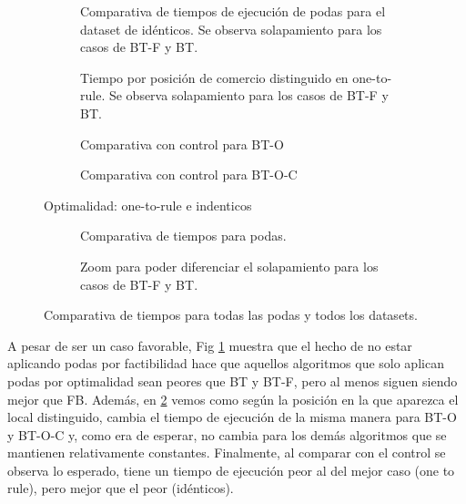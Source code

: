 \begin{figure}[H]
    \centering
    \begin{subfigure}[b]{0.45\textwidth}
        
        \caption{Comparativa de tiempos de ejecución de podas para el dataset de idénticos. Se observa solapamiento para los casos de BT-F y BT.}
        \label{fig:identicos-comp}
    \end{subfigure}
    \begin{subfigure}[b]{0.45\textwidth}
        
        \caption{Tiempo por posición de comercio distinguido en one-to-rule. Se observa solapamiento para los casos de BT-F y BT.}
        \label{fig:one-to-rule-comp}
    \end{subfigure}
    
    \begin{subfigure}[b]{0.45\textwidth}
        \centering
        
        \caption{Comparativa con control para BT-O}
    \end{subfigure}
    \begin{subfigure}[b]{0.45\textwidth}
        \centering
        
        \caption{Comparativa con control para BT-O-C}
    \end{subfigure}
    \caption{Optimalidad: one-to-rule e indenticos}
\end{figure}

\begin{figure}[H]
    \centering
    \begin{subfigure}[b]{0.45\textwidth}
        
        \caption{Comparativa de tiempos para podas.}
    \end{subfigure}
    \begin{subfigure}[b]{0.45\textwidth}
        
        \caption{Zoom para poder diferenciar el solapamiento para los casos de BT-F y BT.}
    \end{subfigure}
    \caption{Comparativa de tiempos para todas las podas y todos los datasets.}
    \label{fig:podas-todos}
\end{figure}

A pesar de ser un caso favorable, Fig \ref{fig:identicos-comp} muestra que el hecho de no estar aplicando podas por factibilidad hace que aquellos algoritmos que solo aplican podas por optimalidad sean peores que BT y BT-F, pero al menos siguen siendo mejor que FB. Además, en \ref{fig:one-to-rule-comp} vemos como según la posición en la que aparezca el local distinguido, cambia el tiempo de ejecución de la misma manera para BT-O y BT-O-C y, como era de esperar, no cambia para los demás algoritmos que se mantienen relativamente constantes. Finalmente, al comparar con el control se observa lo esperado, tiene un tiempo de ejecución peor al del mejor caso (one to rule), pero mejor que el peor (idénticos).

